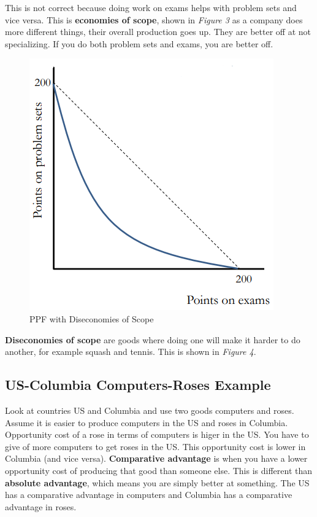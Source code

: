 \documentclass{article}
\begin{document}
This is not correct because doing work on exams helps with problem sets and vice
versa. This is \textbf{economies of scope}, shown in \textit{Figure 3} as a
company does more different things, their overall production goes up. They are
better off at not specializing. If you do both problem sets and exams, you are
better off. 

\begin{figure}[H]
    \centering
    \includegraphics[scale=0.70]{"Figure 2c"}
    \caption{PPF with Diseconomies of Scope}
\end{figure}

\textbf{Diseconomies of scope} are goods where
doing one will make it harder to do another, for example squash and tennis. This
is shown in \textit{Figure 4}.

\subsection{US-Columbia Computers-Roses Example}

Look at countries US and Columbia and use two goods computers and roses. Assume
it is easier to produce computers in the US and roses in Columbia. Opportunity
cost of a rose in terms of computers is higer in the US. You have to give of
more computers to get roses in the US. This opportunity cost is lower in
Columbia (and vice versa). \textbf{Comparative advantage} is when you have a
lower opportunity cost of producing that good than someone else. This is
different than \textbf{absolute advantage}, which means you are simply better at
something. The US has a comparative advantage in computers and Columbia has a
comparative advantage in roses.
\end{document}
